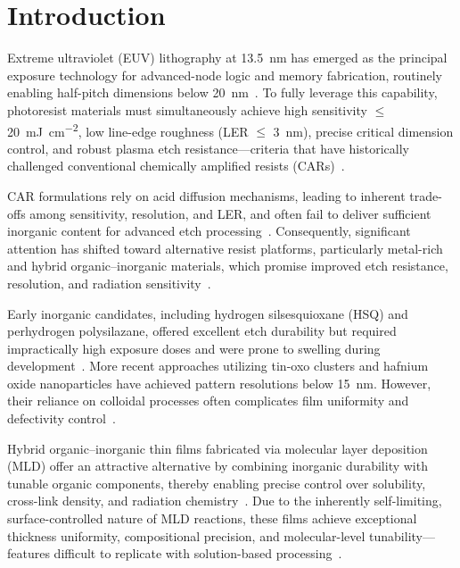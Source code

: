 \section{Introduction}

Extreme ultraviolet (EUV) lithography at \SI{13.5}{\nano\meter} has emerged as the principal exposure technology for advanced-node logic and memory fabrication, routinely enabling half-pitch dimensions below \SI{20}{\nano\meter}~\cite{zhang2016euv,Xu2018}. To fully leverage this capability, photoresist materials must simultaneously achieve high sensitivity \(\leq\) \SI{20}{\milli\joule\per\centi\meter\squared}, low line-edge roughness (LER \(\leq\) \SI{3}{\nano\meter}), precise critical dimension control, and robust plasma etch resistance—criteria that have historically challenged conventional chemically amplified resists (CARs)~\cite{Manouras2020,Mojarad2015,Vesters2018}. 

CAR formulations rely on acid diffusion mechanisms, leading to inherent trade-offs among sensitivity, resolution, and LER, and often fail to deliver sufficient inorganic content for advanced etch processing~\cite{Harumoto2021}. Consequently, significant attention has shifted toward alternative resist platforms, particularly metal-rich and hybrid organic–inorganic materials, which promise improved etch resistance, resolution, and radiation sensitivity~\cite{Cardineau2014Tin,Saifullah2022Review,Ravi2023,Shi2022}.

Early inorganic candidates, including hydrogen silsesquioxane (HSQ) and perhydrogen polysilazane, offered excellent etch durability but required impractically high exposure doses and were prone to swelling during development~\cite{Saifullah2022Review}. More recent approaches utilizing tin-oxo clusters and hafnium oxide nanoparticles have achieved pattern resolutions below \SI{15}{\nano\meter}. However, their reliance on colloidal processes often complicates film uniformity and defectivity control~\cite{Cardineau2014Tin,Saifullah2022Review}.

Hybrid organic–inorganic thin films fabricated via molecular layer deposition (MLD) offer an attractive alternative by combining inorganic durability with tunable organic components, thereby enabling precise control over solubility, cross-link density, and radiation chemistry~\cite{marichy2012mld,meng2017mldreview,Multia2022,Vemuri2023}. Due to the inherently self-limiting, surface-controlled nature of MLD reactions, these films achieve exceptional thickness uniformity, compositional precision, and molecular-level tunability—features difficult to replicate with solution-based processing~\cite{marichy2012mld,Lee2011,Weckman2016}.

